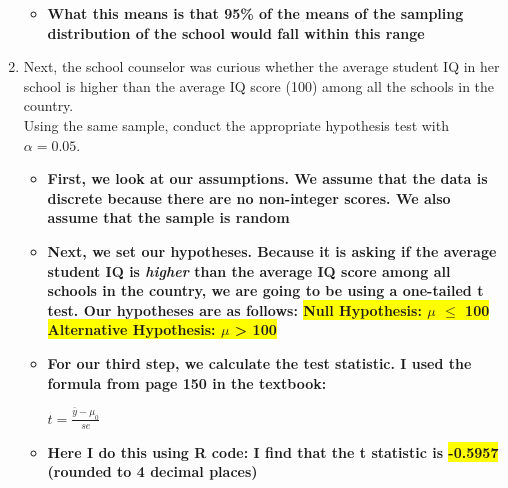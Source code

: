 \documentclass[12pt,letterpaper]{article}
\begin{document}
\begin{enumerate}
\begin{itemize}
			\item \textbf{What this means is that 95\% of the means of the sampling distribution of the school would fall within this range}
		\end{itemize} 
		
		
		
	

	
	\item Next, the school counselor was curious  whether  the average student IQ in her school is higher than the average IQ score (100) among all the schools in the country.\\ 
	
	\noindent Using the same sample, conduct the appropriate hypothesis test with $\alpha=0.05$.
	
	\begin{itemize}
		\item \textbf{First, we look at our assumptions. We assume that the data is discrete because there are no non-integer scores. We also assume that the sample is random}
		
		\item \textbf{Next, we set our hypotheses. Because it is asking if the average student IQ is \textit{higher} than the average IQ score among all schools in the country, we are going to be using a one-tailed t test. Our hypotheses are as follows:
		\newline \colorbox{yellow}{Null Hypothesis: $\mu$ $\le$ 100}
		\newline 
		\colorbox{yellow}{Alternative Hypothesis: $\mu$ > 100} }
		
		\item \textbf{For our third step, we calculate the test statistic. I used the formula from page 150 in the textbook:} \\
		\vspace{-0.5cm}
				
			\begin{center} \begin{LARGE}
					{
				$ t = \frac{\bar{y} - \mu_{0}}{\textit{se}}$} 
			\end{LARGE}
			\end{center}
			
		\item \textbf{Here I do this using R code: I find that the t statistic is \colorbox{yellow}{-0.5957} (rounded to 4 decimal places)}
		
		
		

\end{itemize}
\end{enumerate}
\end{document}
